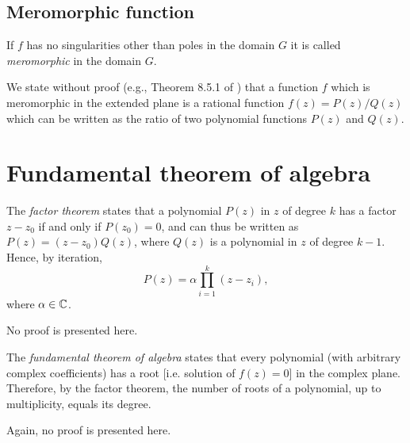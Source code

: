 \subsection{Meromorphic function}

If $f$ has no singularities other than poles in the domain
$G$ it is called {\em meromorphic} in the domain $G$.


We state without proof (e.g., Theorem 8.5.1 of \cite{Hille62})
that a function $f$ which is meromorphic in the extended plane
is a rational function $f(z)=P(z)/Q(z)$
which can be written as the ratio of two polynomial functions
$P(z)$ and $Q(z)$.



\section{Fundamental theorem of algebra}


The {\em factor theorem} states that a polynomial $P(z)$  in $z$  of degree $k$
has a factor $z-z_0$ if and only if $P (z_0)=0$, and can thus be written as $P (z)= (z-z_0)Q(z)$,
where $Q(z)$ is a polynomial  in $z$  of degree $k-1$.
Hence, by iteration,
\begin{equation}
P(z)= \alpha \prod_{i=1}^k \left(z-z_i\right),
\end{equation}
where $\alpha \in {\Bbb C}$.

No proof is presented here.

The {\em fundamental theorem of algebra} states that
every polynomial (with arbitrary complex coefficients) has a root [i.e. solution of $f(z)=0$] in the complex plane.
Therefore, by the factor theorem, the number of roots of a polynomial, up to multiplicity, equals its degree.

Again, no proof
is presented here.

